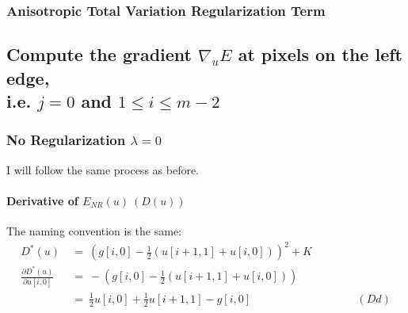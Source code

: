 \documentclass{report}
\begin{document}
			\subsubsection{Anisotropic Total Variation Regularization Term}
			\startsubsection
			\closesection
		\closesection
		
		\subsection{Compute the gradient $\nabla_u E$ at pixels on the left edge, \\ i.e. $j = 0$ and $1 \leq i \leq m-2$}
		\startsubsection
			\subsubsection{No Regularization $\lambda = 0$}
			\startsubsection
				I will follow the same process as before.
				\vspace{-0.4cm} \paragraph{Derivative of  $E_{NR}(u) \ (D(u))$}
				\startsubsection
					The naming convention is the same:
					\vspace{-0.2cm}
					\begin{align*}
						D^*(u) \ & = \ (g[i,0] - \frac{1}{2} (u[i+1,1] + u[i,0]))^2 + K \\
						\frac{\partial D^*(u)}{\partial u[i,0]} \ & = \ - (g[i,0] - \frac{1}{2} (u[i+1,1] + u[i,0])) \\
						& = \ \frac{1}{2} u[i,0]  + \frac{1}{2} u[i+1,1] - g[i,0] \hspace{4cm} (Dd)
					\end{align*}
				\closesection
			\closesection
\end{document}
